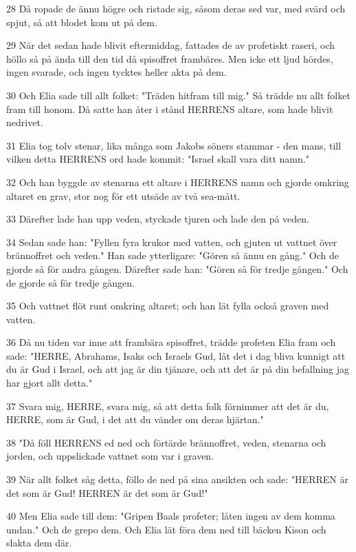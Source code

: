 \par 28 Då ropade de ännu högre och ristade sig, såsom deras sed var, med svärd och spjut, så att blodet kom ut på dem.
\par 29 När det sedan hade blivit eftermiddag, fattades de av profetiskt raseri, och höllo så på ända till den tid då spisoffret frambäres. Men icke ett ljud hördes, ingen svarade, och ingen tycktes heller akta på dem.
\par 30 Och Elia sade till allt folket: "Träden hitfram till mig." Så trädde nu allt folket fram till honom. Då satte han åter i stånd HERRENS altare, som hade blivit nedrivet.
\par 31 Elia tog tolv stenar, lika många som Jakobs söners stammar - den mans, till vilken detta HERRENS ord hade kommit: "Israel skall vara ditt namn."
\par 32 Och han byggde av stenarna ett altare i HERRENS namn och gjorde omkring altaret en grav, stor nog för ett utsäde av två sea-mått.
\par 33 Därefter lade han upp veden, styckade tjuren och lade den på veden.
\par 34 Sedan sade han: "Fyllen fyra krukor med vatten, och gjuten ut vattnet över brännoffret och veden." Han sade ytterligare: "Gören så ännu en gång." Och de gjorde så för andra gången. Därefter sade han: "Gören så för tredje gången." Och de gjorde så för tredje gången.
\par 35 Och vattnet flöt runt omkring altaret; och han lät fylla också graven med vatten.
\par 36 Då nu tiden var inne att frambära spisoffret, trädde profeten Elia fram och sade: "HERRE, Abrahams, Isaks och Israels Gud, låt det i dag bliva kunnigt att du är Gud i Israel, och att jag är din tjänare, och att det är på din befallning jag har gjort allt detta."
\par 37 Svara mig, HERRE, svara mig, så att detta folk förnimmer att det är du, HERRE, som är Gud, i det att du vänder om deras hjärtan."
\par 38 "Då föll HERRENS ed ned och förtärde brännoffret, veden, stenarna och jorden, och uppslickade vattnet som var i graven.
\par 39 När allt folket såg detta, föllo de ned på sina ansikten och sade: "HERREN är det som är Gud! HERREN är det som är Gud!"
\par 40 Men Elia sade till dem: "Gripen Baals profeter; låten ingen av dem komma undan." Och de grepo dem. Och Elia lät föra dem ned till bäcken Kison och slakta dem där.
